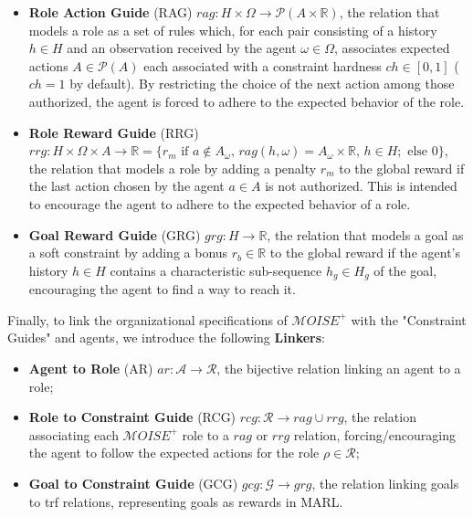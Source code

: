 \documentclass[sigconf,anonymous]{aamas}
\begin{document}
\begin{itemize}
    \item \textbf{Role Action Guide} (RAG) \quad $rag: H \times \Omega \rightarrow \mathcal{P}(A \times \mathbb{R})$, the relation that models a role as a set of rules which, for each pair consisting of a history $h \in H$ and an observation received by the agent $\omega \in \Omega$, associates expected actions $A \in \mathcal{P}(A)$ each associated with a constraint hardness $ch \in [0,1]$ ($ch = 1$ by default). By restricting the choice of the next action among those authorized, the agent is forced to adhere to the expected behavior of the role.
    \item \textbf{Role Reward Guide} (RRG) \quad $rrg: H \times \Omega \times A \to \mathbb{R} = \{r_m \text{ if } a \notin A_\omega \text{, } rag(h, \omega) = A_\omega \times \mathbb{R} \text{, } h \in H; \text{ else } 0\}$, the relation that models a role by adding a penalty $r_m$ to the global reward if the last action chosen by the agent $a \in A$ is not authorized. This is intended to encourage the agent to adhere to the expected behavior of a role.
    \item \textbf{Goal Reward Guide} (GRG) \quad $grg: H \rightarrow \mathbb{R}$, the relation that models a goal as a soft constraint by adding a bonus $r_b \in \mathbb{R}$ to the global reward if the agent's history $h \in H$ contains a characteristic sub-sequence $h_g \in H_g$ of the goal, encouraging the agent to find a way to reach it.
\end{itemize}

Finally, to link the organizational specifications of $\mathcal{M}OISE^+$ with the "Constraint Guides" and agents, we introduce the following \textbf{Linkers}:
\begin{itemize}
    \item \textbf{Agent to Role} (AR) \quad $ar: \mathcal{A} \to \mathcal{R}$, the bijective relation linking an agent to a role;
    \item \textbf{Role to Constraint Guide} (RCG) \quad $rcg: \mathcal{R} \rightarrow rag \cup rrg$, the relation associating each $\mathcal{M}OISE^+$ role to a $rag$ or $rrg$ relation, forcing/encouraging the agent to follow the expected actions for the role $\rho \in \mathcal{R}$;
    \item \textbf{Goal to Constraint Guide} (GCG) \quad $gcg: \mathcal{G} \rightarrow grg$, the relation linking goals to trf relations, representing goals as rewards in MARL.
\end{itemize}
\end{document}
